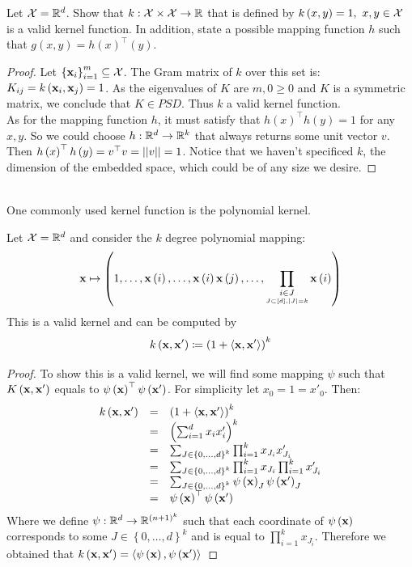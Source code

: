 \begin{exercise}
	Let $\mathcal{X}=\mathbb{R}^d$. Show that $k:\mathcal{X}\times\mathcal{X}\rightarrow \mathbb{R}$ that is defined by $k\left(x,y\right)=1,\,\,x,y\in\mathcal{X}$ is a valid kernel function. In addition, state a possible mapping function $h$ such that $g\left(x,y\right)=h\left(x\right)^\top \left(y\right)$.
\end{exercise}
\begin{proof}
	Let $\left\{\mathbf{x}_i\right\}^m_{i=1}\subseteq\mathcal{X}$. The Gram matrix of $k$ over this set is: $K_{ij}=k\left(\mathbf{x}_i,\mathbf{x}_j\right)=1$. As the eigenvalues of $K$ are $m,0\geq 0$ and $K$ is a symmetric matrix, we conclude that $K\in PSD$. Thus $k$ a valid kernel function.\\ As for the mapping function $h$, it must satisfy that $h\left(x\right)^\top h\left(y\right)=1$ for any $x,y$. So we could choose $h:\mathbb{R}^d\rightarrow\mathbb{R}^k$ that always returns some unit vector $v$. Then $h\left(x\right)^\top h\left(y\right) = v^\top v = \left|\left| v\right|\right| = 1$. Notice that we haven't specificed $k$, the dimension of the embedded space, which could be of any size we desire.
\end{proof}


~\\One commonly used kernel function is the polynomial kernel.
\begin{claim}
	Let $\mathcal{X}=\mathbb{R}^d$ and consider the $k$ degree polynomial mapping:$$\mathbf{x}\mapsto\left(1,\ldots,\mathbf{x}\left(i\right),\ldots,\mathbf{x}\left(i\right)\mathbf{x}\left(j\right),\ldots,\prod_{\underset{J\subset\left[d\right],\left|J\right|=k}{i\in J}}\mathbf{x}\left(i\right)\right)$$
	This is a valid kernel and can be computed by $$ k\left(\mathbf{x},\mathbf{x}'\right)\coloneqq\left(1+\left\langle \mathbf{x},\mathbf{x}'\right\rangle\right)^k $$
\end{claim}
\begin{proof}
	To show this is a valid kernel, we will find some mapping $\psi$ such that $K\left(\mathbf{x},\mathbf{x}'\right)$ equals to $\psi\left(\mathbf{x}\right)^\top \psi\left(\mathbf{x}'\right)$. For simplicity let $x_0=1=x'_0$. Then: 
	$$
	\begin{array}{ccl}
		k\left(\mathbf{x},\mathbf{x}'\right) & = &\left(1+\left\langle \mathbf{x},\mathbf{x}'\right\rangle\right)^k\\
		& = & \left(\sum_{i=1}^d x_ix'_i\right)^k\\
		& = & \sum_{J\in\left\{0,\ldots,d\right\}^k}\prod_{i=1}^{k}x_{J_i}x'_{J_i}\\
		& = & \sum_{J\in\left\{0,\ldots,d\right\}^k}\prod_{i=1}^{k}x_{J_i}\prod_{i=1}^{k}x'_{J_i}\\
		& = & \sum_{J\in\left\{0,\ldots,d\right\}^k}\psi\left(\mathbf{x}\right)_J\psi\left(\mathbf{x}'\right)_J\\
		& = & \psi\left(\mathbf{x}\right)^\top \psi\left(\mathbf{x}'\right)
	\end{array}
	$$
	Where we define $\psi:\mathbb{R}^d\rightarrow\mathbb{R}^{\left(n+1\right)^k}$ such that each coordinate of $\psi\left(\mathbf{x}\right)$ corresponds to some $J\in\left\{0,\ldots,d\right\}^k$ and is equal to $\prod_{i=1}^k x_{J_i}$. Therefore we obtained that $k\left(\mathbf{x},\mathbf{x}'\right) = \left\langle \psi\left(\mathbf{x}\right),\psi\left(\mathbf{x}'\right)\right\rangle$
\end{proof}

